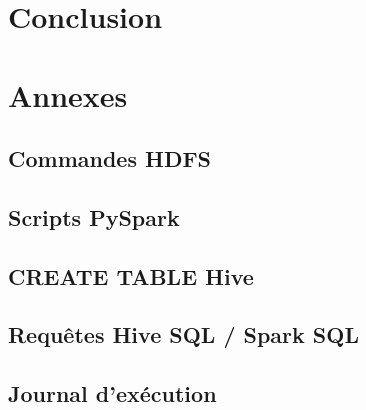 \documentclass[11pt,a4paper]{report}
\begin{document}
\chapter{Conclusion}

\appendix
\chapter{Annexes}
\section{Commandes HDFS}
\section{Scripts PySpark}
\section{CREATE TABLE Hive}
\section{Requêtes Hive SQL / Spark SQL}
\section{Journal d'exécution}
\end{document}
